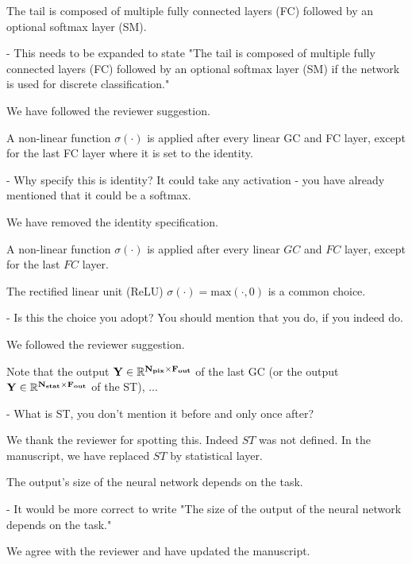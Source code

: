 \documentclass[12pt,a4paper]{article}
\newcommand{\1}{\b{1}}              %
\newcommand{\0}{\b{0}}              %
\begin{document}
\begin{mdframed}[style=comment]
The tail is composed of multiple fully connected layers (FC) followed by an optional softmax layer (SM).

- This needs to be expanded to state "The tail is composed of multiple fully connected layers (FC) followed by an optional softmax layer (SM) if the network is used for discrete classification."
\end{mdframed}
We have followed the reviewer suggestion.

\begin{mdframed}[style=comment]
A non-linear function $\sigma(\cdot)$ is applied after every linear GC and FC layer, except for the last FC layer where it is set to the identity.

- Why specify this is identity? It could take any activation - you have already mentioned that it could be a softmax.
\end{mdframed}
We have removed the identity specification.
\begin{mdframed}[style=manuscript]
A non-linear function $\sigma(\cdot)$ is applied after every linear $GC$ and $FC$ layer, except for the last $FC$ layer.
\end{mdframed}

\begin{mdframed}[style=comment]
The rectified linear unit (ReLU) $\sigma(\cdot) = \textrm{max}(\cdot, 0)$ is a common choice.

- Is this the choice you adopt? You should mention that you do, if you indeed do.
\end{mdframed}
We followed the reviewer suggestion.

\begin{mdframed}[style=comment]
Note that the output $\bf{Y}\in\mathbb{R}^{N_{pix}\times F_{out}}$ of the last GC (or the output $\bf{Y}\in\mathbb{R}^{N_{stat}\times F_{out}}$ of the ST), ...

- What is ST, you don't mention it before and only once after?
\end{mdframed}
We thank the reviewer for spotting this. Indeed $ST$ was not defined. In the manuscript, we have replaced $ST$ by statistical layer.

\begin{mdframed}[style=comment]
The output’s size of the neural network depends on the task.

- It would be more correct to write "The size of the output of the neural network depends on the task."
\end{mdframed}
We agree with the reviewer and have updated the manuscript.
\end{document}
